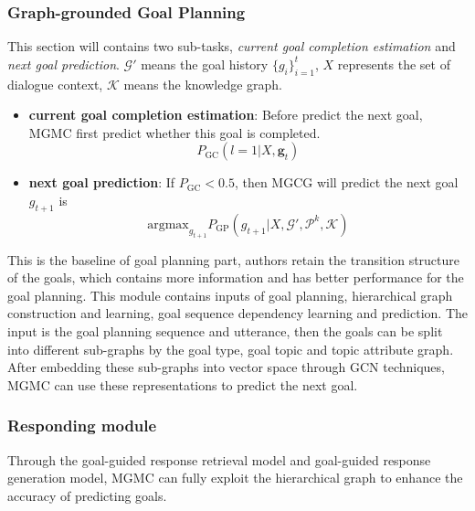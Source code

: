 \documentclass[11pt]{article}
\begin{document}
\subsubsection{Graph-grounded Goal Planning}
This section will contains two sub-tasks, \textit{current goal completion estimation} and \textit{next goal prediction}. $\mathcal{G'}$ means the goal history $\{g_i\}_{i = 1}^t$, $X$ represents the set of dialogue context, $\mathcal{K}$ means the knowledge graph.
\begin{itemize}
    \item \textbf{current goal completion estimation}: Before predict the next goal, MGMC first predict whether this goal is completed.
    \begin{equation}
        P_{\text{GC}}(l = 1|X, \mathbf{g}_t)
    \end{equation}
    \item \textbf{next goal prediction}: If $P_{\text{GC}} < 0.5$, then MGCG will predict the next goal $g_{t+1}$ is
    \begin{equation}
        \text{argmax}_{g_{t+1}}P_{\text{GP}}(g_{t+1}|X, \mathcal{G}', \mathcal{P}^k, \mathcal{K})
    \end{equation}
\end{itemize}
This is the baseline of goal planning part, authors retain the transition structure of the goals, which contains more information and has better performance for the goal planning. This module contains inputs of goal planning, hierarchical graph construction and learning, goal sequence dependency learning and prediction. \citet{liuGraphGroundedGoalPlanning2022} The input is the goal planning sequence and utterance, then the goals can be split into different sub-graphs by the goal type, goal topic and topic attribute graph. After embedding these sub-graphs into vector space through GCN techniques, MGMC can use these representations to predict the next goal.

\subsubsection{Responding module}
Through the goal-guided response retrieval model and goal-guided response generation model, MGMC can fully exploit the hierarchical graph to enhance the accuracy of predicting goals.
\end{document}
